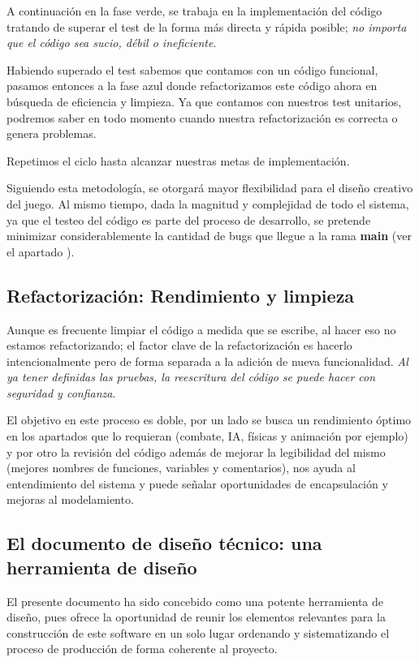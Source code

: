 A continuación en la fase verde, se trabaja en la implementación del código tratando de superar el test de la forma más directa y rápida posible; \textit{no importa que el código sea sucio, débil o ineficiente}.

Habiendo superado el test sabemos que contamos con un código funcional, pasamos entonces a la fase azul donde refactorizamos este código ahora en búsqueda de eficiencia y limpieza. Ya que contamos con nuestros test unitarios, podremos saber en todo momento cuando nuestra refactorización es correcta o genera problemas.

Repetimos el ciclo hasta alcanzar nuestras metas de implementación.

Siguiendo esta metodología, se otorgará mayor flexibilidad para el diseño creativo del juego. Al mismo tiempo, dada la magnitud y complejidad de todo el sistema, ya que el testeo del código es parte del proceso de desarrollo, se pretende minimizar considerablemente la cantidad de bugs que llegue a la rama \textbf{main} (ver el apartado ).

\subsection{Refactorización: Rendimiento y limpieza}\label{principios:refactorizacion-rendimiento-limpieza}
Aunque es frecuente limpiar el código a medida que se escribe, al hacer eso no estamos refactorizando; el factor clave de la refactorización es hacerlo intencionalmente pero de forma separada a la adición de nueva funcionalidad. \emph{Al ya tener definidas las pruebas, la reescritura del código se puede hacer con seguridad y confianza}.

El objetivo en este proceso es doble, por un lado se busca un rendimiento óptimo en los apartados que lo requieran (combate, IA, físicas y animación por ejemplo) y por otro la revisión del código además de mejorar la legibilidad del mismo (mejores nombres de funciones, variables y comentarios), nos ayuda al entendimiento del sistema y puede señalar oportunidades de encapsulación y mejoras al modelamiento.

\subsection{El documento de diseño técnico: una herramienta de diseño}\label{principios:documento-tecnico-como-herramienta}
El presente documento ha sido concebido como una potente herramienta de diseño, pues ofrece la oportunidad de reunir los elementos relevantes para la construcción de este software en un solo lugar ordenando y sistematizando el proceso de producción de forma coherente al proyecto.

